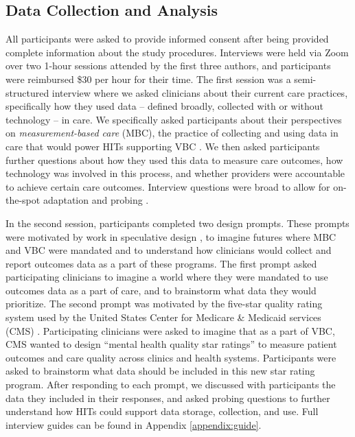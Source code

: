 \subsection{Data Collection and Analysis}
\label{sec:methods:data}

All participants were asked to provide informed consent after being provided complete information about the study procedures.
Interviews were held via Zoom over two 1-hour sessions attended by the first three authors, and participants were reimbursed \$30 per hour for their time.
The first session was a semi-structured interview where we asked clinicians about their current care practices, specifically how they used data -- defined broadly, collected with or without technology -- in care.
We specifically asked participants about their perspectives on \textit{measurement-based care} (MBC), the practice of collecting and using data in care that would power HITs supporting VBC \cite{kilbourne_measuring_2018}.
We then asked participants further questions about how they used this data to measure care outcomes, how technology was involved in this process, and whether providers were accountable to achieve certain care outcomes.
Interview questions were broad to allow for on-the-spot adaptation and probing \cite{barriball_collecting_1994}.

In the second session, participants completed two design prompts.
These prompts were motivated by work in speculative design \cite{hockenhull_speculative_2021, wong_influence_2008}, to imagine futures where MBC and VBC were mandated and to understand how clinicians would collect and report outcomes data as a part of these programs.
The first prompt asked participating clinicians to imagine a world where they were mandated to use outcomes data as a part of care, and to brainstorm what data they would prioritize.
The second prompt was motivated by the five-star quality rating system used by the United States Center for Medicare \& Medicaid services (CMS) \cite{center_for_medicare__medicaid_services_five-star_2022}.
Participating clinicians were asked to imagine that as a part of VBC, CMS wanted to design ``mental health quality star ratings'' to measure patient outcomes and care quality across clinics and health systems.
Participants were asked to brainstorm what data should be included in this new star rating program.
After responding to each prompt, we discussed with participants the data they included in their responses, and asked probing questions to further understand how HITs could support data storage, collection, and use.
Full interview guides can be found in Appendix \ref{appendix:guide}.

